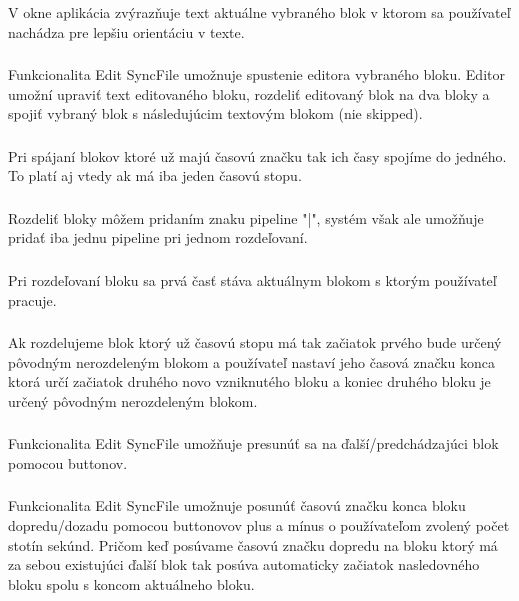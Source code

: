 \documentclass{article}
\begin{document}
\subsubsection{}
V okne aplikácia zvýrazňuje text aktuálne vybraného blok v ktorom sa používateľ nachádza pre lepšiu orientáciu v texte.

\subsubsection{}
Funkcionalita Edit SyncFile umožnuje spustenie editora vybraného bloku. Editor umožní upraviť text editovaného bloku, rozdeliť editovaný blok na dva bloky a spojiť vybraný blok s následujúcim textovým blokom (nie skipped). 

\subsubsection{}
Pri spájaní blokov ktoré už majú časovú značku tak ich časy spojíme do jedného. To platí aj vtedy ak má iba jeden časovú stopu. 

\subsubsection{}
Rozdeliť bloky môžem pridaním znaku pipeline "|", systém však ale umožňuje pridať iba jednu pipeline pri jednom rozdeľovaní.

\subsubsection{}
Pri rozdeľovaní bloku sa prvá časť stáva aktuálnym blokom s ktorým používateľ pracuje. 

\subsubsection{}
Ak rozdelujeme blok ktorý už časovú stopu má tak začiatok prvého bude určený pôvodným nerozdeleným blokom a používateľ nastaví jeho časová značku konca ktorá určí začiatok druhého novo vzniknutého bloku a koniec druhého bloku je určený pôvodným nerozdeleným blokom.

\subsubsection{}
Funkcionalita Edit SyncFile umožňuje presunúť sa na ďalší/predchádzajúci blok pomocou buttonov. 

\subsubsection{}
Funkcionalita Edit SyncFile umožnuje posunúť časovú značku konca bloku dopredu/dozadu pomocou buttonovov plus a mínus o používateľom zvolený počet stotín sekúnd. Pričom keď posúvame časovú značku dopredu na bloku ktorý má za sebou existujúci ďalší blok tak posúva automaticky začiatok nasledovného bloku spolu s koncom aktuálneho bloku.
\end{document}
